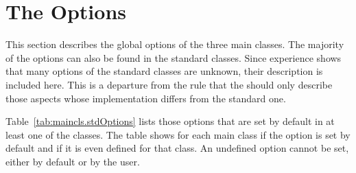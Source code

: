 \section{The Options}
\label{sec:maincls.options}


This section describes the global options of the three main classes.
The majority of the options can also be found in the standard classes.
Since experience shows that many options of the standard classes are
unknown, their description is included here. This is a departure from
the rule that the  should only describe those aspects
whose implementation differs from the standard one.

Table~\ref{tab:maincls.stdOptions} lists those options that are set by
default in at least one of the {\KOMAScript} classes. The table shows
for each {\KOMAScript} main class if the option is set by default and
if it is even defined for that class. An undefined option cannot be
set, either by default or by the user.


